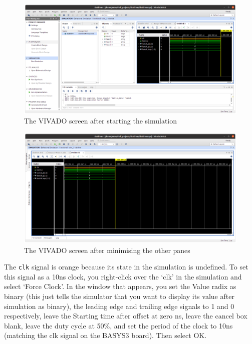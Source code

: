 \documentclass[../physical_computing.tex]{subfiles}
\begin{document}
\begin{figure}[htbp]
    \centering
    \includegraphics[width=1.0\textwidth]{appendix_7/figures/vivado_aftersimstart.png}
    \caption{The VIVADO screen after starting the simulation}
    \label{fig:vivdac1}
\end{figure}
\begin{figure}[htbp]
    \centering
    \includegraphics[width=1.0\textwidth]{appendix_7/figures/vivdac2.png}
    \caption{The VIVADO screen after minimising the other panes}
    \label{fig:vivdac2}
\end{figure}

The \texttt{clk} signal is orange because its state in the simulation is undefined. To set this signal as a 10ns clock, you right-click over the `clk' in the simulation and select `Force Clock'. In the window that appears, you set the Value radix as binary (this just tells the simulator that you want to display its value after simulation as binary), the leading edge and trailing edge signals to 1 and 0 respectively, leave the Starting time after offset at zero ns, leave the cancel box blank, leave the duty cycle at 50\%, and set the period of the clock to 10ns (matching the clk signal on the BASYS3 board). Then select OK. 
\end{document}
